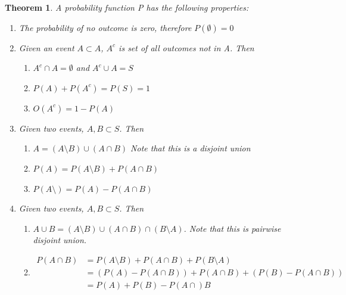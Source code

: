 \documentclass[11pt,oneside]{book}
\theoremstyle{newStyle}
\newtheorem{thm}{Theorem}[chapter]
\begin{document}
\begin{thm}
A probability function P has the following properties:\begin{enumerate}[itemsep=0pt, topsep=1pt, partopsep=0pt,label=(\roman*)]
\item The probability of no outcome is zero, therefore $P(\emptyset)=0$
\item Given an event $A\subset A$, $A^c$ is set of all outcomes not in A. Then \begin{enumerate}
[itemsep=0pt, topsep=1pt, partopsep=0pt,label=(\alph*)]
\item $A^c\cap A=\emptyset$ and $A^c\cup A=S$
\item $P(A)+P(A^c)=P(S)=1$
\item $O(A^c)=1-P(A)$
\end{enumerate}
\item Given two events, $A,B \subset S$. Then \begin{enumerate}
[itemsep=0pt, topsep=1pt, partopsep=0pt,label=(\alph*)]
\item $A=(A\setminus B)\cup (A\cap B)$ \color{red} Note that this is a disjoint union \color{black}
\item $P(A)=P(A\setminus B)+P(A\cap B)$
\item $P(A\setminus)=P(A)-P(A\cap B)$
\end{enumerate}
\item Given two events,  $A,B \subset S$. Then \begin{enumerate}
[itemsep=0pt, topsep=1pt, partopsep=0pt,label=(\alph*)]
\item $A\cup B=(A\setminus B)\cup (A\cap B)\cap (B\setminus A)$. \color{red}Note that this is pairwise disjoint union\color{black}. 
\item \begin{align*}
P(A\cap B)&=P(A\setminus B)+P(A\cap B)+P(B\setminus A)\\
&=\left(P(A)-P(A\cap B) \right)+P(A\cap B)+\left(P(B)-P(A\cap B) \right)\\
&=P(A)+P(B)-P(A\cap)B
\end{align*}
\end{enumerate}
\end{enumerate}
\end{thm}
\end{document}
